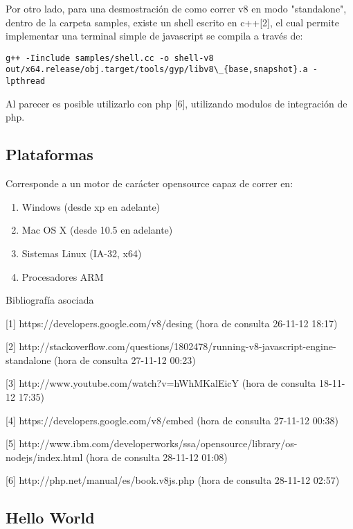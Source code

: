 Por otro lado, para una desmostración de como correr v8 en modo "standalone", dentro de la carpeta samples, existe un shell 
escrito en c++[2], el cual permite implementar una terminal simple de javascript
se compila a través de:
\begin{verbatim}
g++ -Iinclude samples/shell.cc -o shell-v8 
out/x64.release/obj.target/tools/gyp/libv8\_{base,snapshot}.a -lpthread
\end{verbatim}



Al parecer es posible utilizarlo con php [6], utilizando modulos de integración de php.

\subsection{Plataformas}
 Corresponde a un motor de carácter opensource capaz de correr en:
\begin{enumerate}
 \item Windows (desde xp en adelante)
 \item Mac OS X (desde 10.5 en adelante)
 \item Sistemas Linux (IA-32, x64)
 \item Procesadores ARM 
\end{enumerate}


Bibliografía asociada

[1] https://developers.google.com/v8/desing (hora de consulta 26-11-12 18:17)

[2] http://stackoverflow.com/questions/1802478/running-v8-javascript-engine-standalone (hora de consulta 27-11-12 00:23)

[3] http://www.youtube.com/watch?v=hWhMKalEicY (hora de consulta 18-11-12 17:35)

[4] https://developers.google.com/v8/embed (hora de consulta 27-11-12 00:38)

[5] http://www.ibm.com/developerworks/ssa/opensource/library/os-nodejs/index.html (hora de consulta 28-11-12 01:08)

[6] http://php.net/manual/es/book.v8js.php (hora de consulta 28-11-12 02:57)


\subsection{Hello World}

